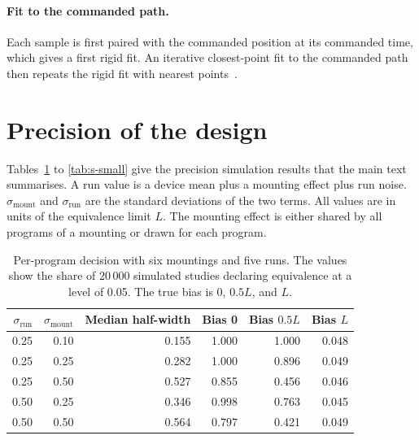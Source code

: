 \documentclass[11pt,a4paper]{article}
\begin{document}
\paragraph{Fit to the commanded path.}
Each sample is first paired with the commanded position at its commanded time, which gives a first rigid fit.
An iterative closest-point fit to the commanded path then repeats the rigid fit with nearest points~\cite{Besl1992}.

\section{Precision of the design}
\label{sec:s-precision}
Tables~\ref{tab:s-program} to \ref{tab:s-small} give the precision simulation results that the main text summarises.
A run value is a device mean plus a mounting effect plus run noise.
$\sigma_\mathrm{mount}$ and $\sigma_\mathrm{run}$ are the standard deviations of the two terms.
All values are in units of the equivalence limit $L$.
The mounting effect is either shared by all programs of a mounting or drawn for each program.

\begin{table}[ht]
\centering
\caption{Per-program decision with six mountings and five runs.
The values show the share of 20\,000 simulated studies declaring equivalence at a level of 0.05.
The true bias is 0, $0.5L$, and $L$.}
\label{tab:s-program}
\begin{tabular}{@{}rrrrrr@{}}
\toprule
$\sigma_\mathrm{run}$ & $\sigma_\mathrm{mount}$ & Median half-width & Bias 0 & Bias $0.5L$ & Bias $L$ \\
\midrule
0.25 & 0.10 & 0.155 & 1.000 & 1.000 & 0.048 \\
0.25 & 0.25 & 0.282 & 1.000 & 0.896 & 0.049 \\
0.25 & 0.50 & 0.527 & 0.855 & 0.456 & 0.046 \\
0.50 & 0.25 & 0.346 & 0.998 & 0.763 & 0.045 \\
0.50 & 0.50 & 0.564 & 0.797 & 0.421 & 0.049 \\
\bottomrule
\end{tabular}
\end{table}
\end{document}
